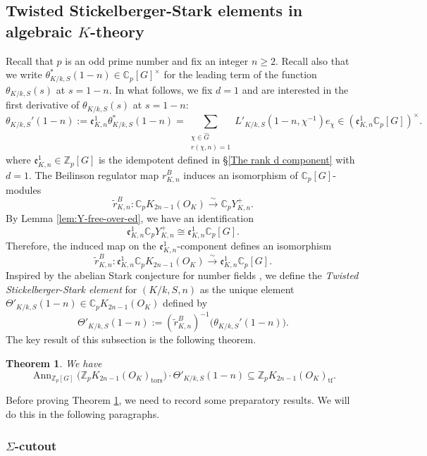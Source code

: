 \documentclass[a4paper,11pt]{article}
\newtheorem{theorem}{Theorem}[section]
\begin{document}
\subsection{Twisted Stickelberger-Stark elements in algebraic $K$-theory}\label{subsect4.2}
Recall that $p$ is an odd prime number and fix an integer $n\geq 2$.
Recall also that we write $\theta_{K/k,S}^*(1-n)\in\mathbb{C}_p[G]^\times$ for the leading term 
of the function $\theta_{K/k,S}(s)$ at  $s=1-n$. In what follows, we fix $d=1$ and are interested in the first derivative of  $\theta_{K/k,S}(s)$ at  $s=1-n$:
\[
\theta_{K/k,S}'(1-n)
:=
\mathfrak e^1_{K,n}\theta_{K/k,S}^*(1-n)
=
\sum_{\substack{\chi\in\widehat G\\ r(\chi,n)=1}}
L'_{K/k,S}(1-n,\chi^{-1})e_\chi
\in
(\mathfrak e^1_{K,n}\mathbb C_p[G])^\times.
\]
where $\mathfrak e^1_{K,n}\in\mathbb{Z}_p[G]$ is the idempotent defined in \S \ref{The rank d component} with $d=1$. The Beilinson regulator map \(r^B_{K,n}\) induces an isomorphism
of \(\mathbb C_p[G]\)-modules
\[
\widetilde r^B_{K,n}:
\mathbb C_p K_{2n-1}(O_K)
\xrightarrow{\sim}
\mathbb C_p Y_{K,n}^{+}.
\]
By Lemma \ref{lem:Y-free-over-ed}, we have an identification
\[
\mathfrak e^1_{K,n}\mathbb C_p Y_{K,n}^{+}\cong \mathfrak e^1_{K,n}\mathbb C_p[G].
\]
Therefore, the induced map on the $\mathfrak e^1_{K,n}$-component defines an isomorphism
\[
\widetilde r^B_{K,n}:
\mathfrak e^1_{K,n}\mathbb C_p K_{2n-1}(O_K)
\xrightarrow{\sim}
\mathfrak e^1_{K,n}\mathbb C_p [G].
\]
Inspired by the abelian Stark conjecture for number fields \cite{Stark}, we define the \textit{Twisted Stickelberger-Stark element} for $(K/k, S, n)$ as the unique element $\Theta'_{K/k,S}(1-n)\in\mathbb{C}_pK_{2n-1}(O_K)$ defined by
\[
\Theta'_{K/k,S}(1-n):=(\widetilde r^B_{K,n})^{-1}\big( \theta_{K/k,S}'(1-n)\big).
\]
The key result of this subsection is the following theorem.
\begin{theorem}
\label{Thm:annihilated-integrality-of-Theta-prime}
We have
\[
\operatorname{Ann}_{\mathbb Z_p[G]}
\bigl(\mathbb Z_pK_{2n-1}(O_K)_{\mathrm{tors}}\bigr)
\cdot
\Theta'_{K/k,S}(1-n)
\subseteq
\mathbb Z_pK_{2n-1}(O_K)_{\mathrm{tf}}.
\]
\end{theorem}
Before proving Theorem \ref{Thm:annihilated-integrality-of-Theta-prime}, we need to record some preparatory results. We will do this in the following paragraphs.
\subsubsection{$\Sigma$-cutout}
\end{document}

